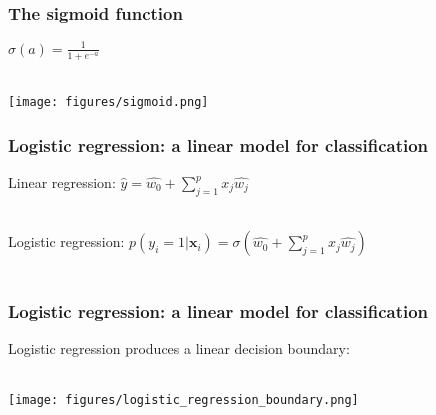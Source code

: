 \documentclass[notes]{beamer}          %
\newif\iffull
\begin{document}
\begin{frame}
\frametitle{The sigmoid function}
\begin{center}
$\sigma(a) = \frac{1}{1 + e^{-a}}$ \\~\

\texttt{[image: figures/sigmoid.png]} \\
\end{center}
\end{frame}

\begin{frame}
\frametitle{Logistic regression: a linear model for classification}


\begin{center}
Linear regression:
$\hat{y} = \hat{w_0} + \sum_{j=1}^{p} x_j \hat{w_j}$ \\~\
\end{center}

\begin{center}
Logistic regression:
$p(y_i = 1 \vert \mathbf{x}_i) = \sigma(\hat{w_0} + \sum_{j=1}^{p} x_j \hat{w_j})$ \\~\
\end{center}
\end{frame}

\iffull
\begin{frame}
\frametitle{Logistic regression: another view}

\begin{center}
The log-odds that the sample belongs to class ``1'' are modelled with a linear model: \\~\

$log(\frac{p(y_i = 1 \vert \mathbf{x}_i)}{p(y_i = 0 \vert \mathbf{x}_i)}) = \hat{w_0} + \sum_{j=1}^{p} x_j \hat{w_j}$ \\~\

$log(\frac{p(y_i = 1 \vert \mathbf{x}_i)}{1 - p(y_i = 1 \vert \mathbf{x}_i)}) = \hat{w_0} + \sum_{j=1}^{p} x_j \hat{w_j}$ \\~\

\end{center}
\end{frame}
\fi

\begin{frame}
\frametitle{Logistic regression: a linear model for classification}
\begin{center}
Logistic regression produces a linear decision boundary: \\~\

\texttt{[image: figures/logistic\_regression\_boundary.png]} \\
\end{center}
\end{frame}
\end{document}
